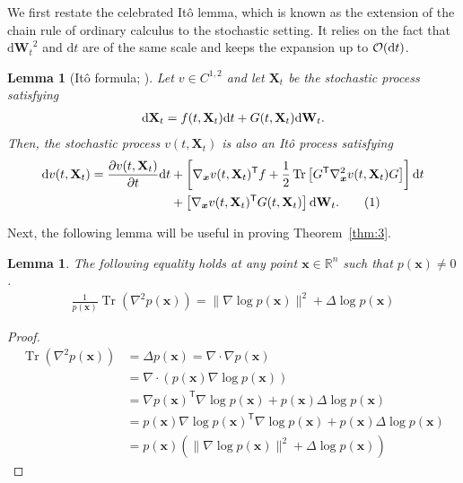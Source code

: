 \documentclass{article}
\def\rd{{\textnormal{d}}}
\def\rvX{{\mathbf{X}}}
\def\vx{{\bm{x}}}
\DeclareMathOperator{\Tr}{Tr}
\def\wt{{ \mathbf{W}_t }}
\def\dwt{{ \mathrm{d} \wt }}
\newcommand{\norm}[1]{\lVert#1\rVert}
\def\dt{{ \mathrm{d} t }}
\def\calO{{\cal O}}
\newcommand{\fracpartial}[2]{\frac{\partial #1}{\partial  #2}}
\newcommand{\br}[1]{\left[#1\right]}
\newcommand{\pr}[1]{\left(#1\right)}
\newcommand{\T}{\mathsf{T}}
\newtheorem{lemma}[theorem]{Lemma}
\newcommand\numberthis{\addtocounter{equation}{1}\tag{\theequation}}
\begin{document}
We first restate the celebrated It{\^o} lemma, which is known as the extension of the chain rule of ordinary calculus to the stochastic setting. It relies on the fact that $\dwt^2$ and $\dt$ are of the same scale and
keeps the expansion up to $\calO(\dt)$.
\begin{lemma}[It{\^o} formula; \citet{ito1951stochastic}] \label{lemma:ito}
  Let $v \in C^{1,2}$ and let $\rvX_t$ be the stochastic process satisfying
  \begin{align*}
    \rd \rvX_t = f(t, \rvX_t) \dt + G(t, \rvX_t) \dwt.
  \end{align*}
  Then, the stochastic process $v(t,\rvX_t)$ is also an It{\^o} process satisfying
  \begin{align*}
    \rd v(t,\rvX_t) =
      \fracpartial{v(t,\rvX_t)}{t}\dt
      &+ \br{ \nabla_\vx v(t,\rvX_t)^\T f + \frac{1}{2}\Tr\br{G^\T \nabla_\vx^2v(t,\rvX_t) G} } \dt \\
      &+ \br{ \nabla_\vx v(t,\rvX_t)^\T G(t, \rvX_t) } \dwt.
      \numberthis \label{eq:ito}
  \end{align*}
\end{lemma}

Next, the following lemma will be useful in proving Theorem~\ref{thm:3}.
\begin{lemma} \label{lemma:sbp}
  The following equality holds at any point $\vx \in \mathbb{R}^n$ such that $p(\vx)\neq 0$.
  \begin{align*}
    \frac{1}{p(\vx)} \Tr\pr{\nabla^2p(\vx)} = \norm{\nabla \log p(\vx)}^2 + \Delta \log p(\vx)
  \end{align*}
\end{lemma}
\begin{proof}
  \begin{align*}
       \Tr\pr{\nabla^2p(\vx)}
    &= \Delta p(\vx)
    = \nabla \cdot \nabla p(\vx) \\
    &= \nabla \cdot \pr{ p(\vx) \nabla \log p(\vx) } \\
    &= \nabla p(\vx)^\T \nabla \log p(\vx) + p(\vx) \Delta \log p(\vx) \\
    &= p(\vx) \nabla \log p(\vx)^\T \nabla \log p(\vx) + p(\vx) \Delta \log p(\vx) \\
    &= p(\vx) \pr{\norm{\nabla \log p(\vx)}^2 + \Delta \log p(\vx)}
  \end{align*}
\end{proof}
\end{document}
